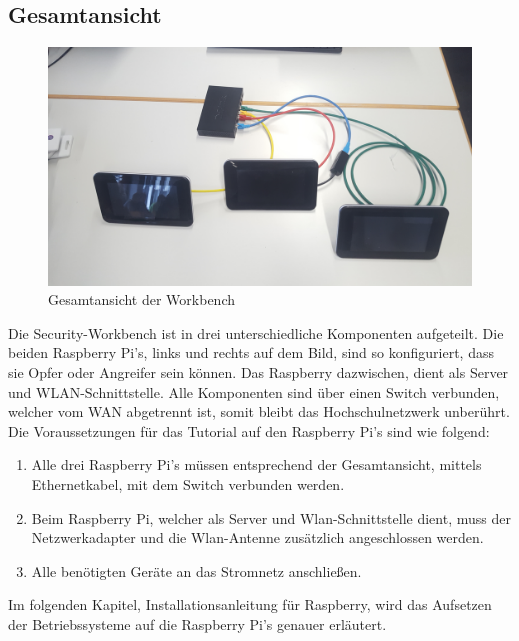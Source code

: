 \subsection{Gesamtansicht}
    	\begin{figure}[H]
		\centering
		\includegraphics[angle=180, width=1.0\textwidth]{images/raspberry_aufbau/gesAns.jpg}
		\caption{Gesamtansicht der Workbench}
	\end{figure} %
Die Security-Workbench ist in drei unterschiedliche Komponenten aufgeteilt. Die beiden Raspberry Pi's, links und rechts auf dem Bild, sind so konfiguriert, dass sie Opfer oder Angreifer sein können. Das Raspberry dazwischen, dient als Server und WLAN-Schnittstelle. Alle Komponenten sind über einen Switch verbunden, welcher vom WAN abgetrennt ist, somit bleibt das Hochschulnetzwerk unberührt. Die Voraussetzungen für das Tutorial auf den Raspberry Pi's sind wie folgend:\\
\begin{enumerate}
	\item Alle drei Raspberry Pi's müssen entsprechend der Gesamtansicht, mittels Ethernetkabel, mit dem Switch verbunden werden.
    \item Beim Raspberry Pi, welcher als Server und Wlan-Schnittstelle dient, muss der Netzwerkadapter und die Wlan-Antenne zusätzlich angeschlossen werden.
    \item Alle benötigten Geräte an das Stromnetz anschließen. 
\end{enumerate}
Im folgenden Kapitel, Installationsanleitung für Raspberry, wird das Aufsetzen der Betriebssysteme auf die Raspberry Pi's genauer erläutert.